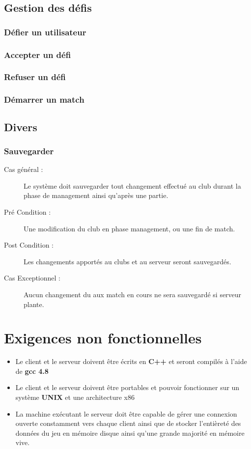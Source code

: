 \documentclass[a4paper]{report}
\begin{document}
\subsection{Gestion des défis}
\subsubsection{Défier un utilisateur}

\subsubsection{Accepter un défi}


\subsubsection{Refuser un défi}


\subsubsection{Démarrer un match}


\subsection{Divers}
\subsubsection{Sauvegarder}
\begin{description}
    \item[Cas général :] Le système doit sauvegarder tout changement effectué au \gls{club} durant la phase de management ainsi qu'après une partie.
    \item[Pré Condition  :] Une modification du \gls{club} en phase management, ou une fin de match.
    \item[Post Condition :] Les changements apportés au \glspl{club} et au \gls{serveur} seront sauvegardés.
    \item[Cas Exceptionnel :] Aucun changement du aux match en cours ne sera sauvegardé si \gls{serveur} plante.
\end{description}


\section{Exigences non fonctionnelles}
\label{enf}
\begin{itemize}
    \item Le \gls{client} et le \gls{serveur} doivent être écrits en \textbf{C++} et seront compilés à l'aide de \textbf{gcc 4.8}
    \item Le \gls{client} et le \gls{serveur} doivent être portables et pouvoir fonctionner sur un système \textbf{UNIX} et une architecture x86
    \item La machine exécutant le \gls{serveur} doit être capable de gérer une connexion ouverte constamment vers chaque \gls{client} ainsi que de stocker l'entièreté des données du jeu en mémoire disque ainsi qu'une grande majorité en mémoire vive.
\end{itemize}
\end{document}
